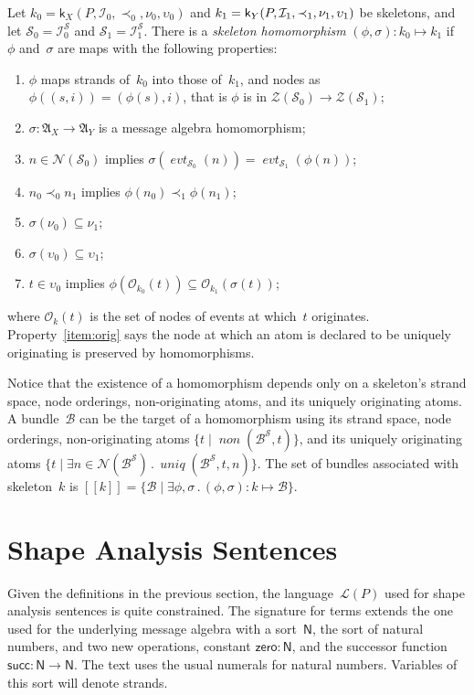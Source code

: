 \documentclass[12pt]{article}
\newcommand{\fn}[1]{\ensuremath{\operatorname{\mathit{#1}}}}
\newcommand{\srt}[1]{\ensuremath{\mathsf{#1}}}
\newcommand{\typ}{\mathbin:}
\newcommand{\some}[1]{\exists#1\mathpunct.}
\newcommand{\alg}[1]{\ensuremath{\mathfrak{#1}}}
\newcommand{\msg}{\alg{A}}
\newcommand{\ssp}{\ensuremath{\mathcal{S}}}
\newcommand{\bun}{\ensuremath{\mathcal{B}}}
\newcommand{\strands}{\ensuremath{\mathcal{Z}}}
\newcommand{\nodes}{\ensuremath{\mathcal{N}}}
\newcommand{\lang}{\mathcal{L}}
\newcommand{\skel}{\mathsf{k}}
\newcommand{\insts}{\mathcal{I}}
\newcommand{\evt}{\fn{evt}}
\newcommand{\orig}{\mathcal{O}}
\newcommand{\sembrack}[1]{[\![#1]\!]}
\begin{document}
Let $k_0=\skel_X(P,\insts_0,\prec_0,\nu_0,\upsilon_0)$ and
$k_1=\skel_Y(P,\insts_1,\prec_1,\break\nu_1,\upsilon_1)$ be skeletons,
and let $\ssp_0=\insts^\ssp_0$ and $\ssp_1=\insts^\ssp_1$.  There is a
\emph{skeleton homomorphism} $(\phi,\sigma)\colon k_0\mapsto k_1$
if~$\phi$ and~$\sigma$ are maps with the following properties:
\begin{enumerate}
\item $\phi$ maps strands of~$k_0$ into those of~$k_1$, and nodes as
  $\phi((s,i))=(\phi(s),i)$, that is $\phi$ is in
  $\strands(\ssp_0)\to\strands(\ssp_1)$;
\item $\sigma\colon\msg_X\to\msg_Y$ is a message algebra homomorphism;
\item $n\in\nodes(\ssp_0)$ implies
  $\sigma(\evt_{\ssp_0}(n))=\evt_{\ssp_1}(\phi(n))$;
\item $n_0\prec_0
n_1$ implies $\phi(n_0)\prec_1\phi(n_1)$;
\item $\sigma(\nu_0)\subseteq \nu_1$;
\item $\sigma(\upsilon_0)\subseteq \upsilon_1$;
\item\label{item:orig} $t\in \upsilon_0$ implies
  $\phi(\orig_{k_0}(t))\subseteq\orig_{k_1}(\sigma(t))$;
\end{enumerate}
where $\orig_k(t)$ is the set of nodes of events at which~$t$
originates.  Property~\ref{item:orig} says the node at which an atom
is declared to be uniquely originating is preserved by homomorphisms.

Notice that the existence of a homomorphism depends only on a
skeleton's strand space, node orderings, non-originating atoms, and
its uniquely originating atoms.  A bundle~{\bun} can be the target of
a homomorphism using its strand space, node orderings, non-originating
atoms $\{t\mid \fn{non}(\bun^\ssp,t)\}$, and its uniquely originating
atoms $\{t\mid\some{n\in\nodes(\bun^\ssp)}\fn{uniq}(\bun^\ssp,t,n)\}$.
The set of bundles associated with skeleton~$k$ is
\(\sembrack{k}=\{\bun\mid\some{\phi,\sigma}(\phi,\sigma)\colon
k\mapsto\bun\}.\)

\section{Shape Analysis Sentences}\label{sec:shape analysis sentences}

Given the definitions in the previous section, the language~$\lang(P)$
used for shape analysis sentences is quite constrained.
The signature for terms extends the one used for the underlying
message algebra with a sort~$\srt{N}$, the sort of natural numbers,
and two new operations, constant $\mathsf{zero}\typ\srt{N}$, and the
successor function $\mathsf{succ}\typ\srt{N}\to\srt{N}$.  The text
uses the usual numerals for natural numbers.  Variables of this sort
will denote strands.
\end{document}
